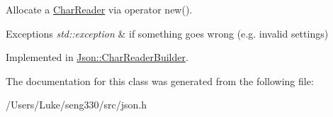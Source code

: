 Allocate a \hyperlink{class_json_1_1_char_reader}{Char\+Reader} via operator new(). 


\begin{DoxyExceptions}{Exceptions}
{\em std\+::exception} & if something goes wrong (e.\+g. invalid settings) \\
\hline
\end{DoxyExceptions}


Implemented in \hyperlink{class_json_1_1_char_reader_builder_a29e41475c2b40a9ab3da10e7c09f6bfd}{Json\+::\+Char\+Reader\+Builder}.



The documentation for this class was generated from the following file\+:\begin{DoxyCompactItemize}
\item 
/\+Users/\+Luke/seng330/src/json.\+h\end{DoxyCompactItemize}
